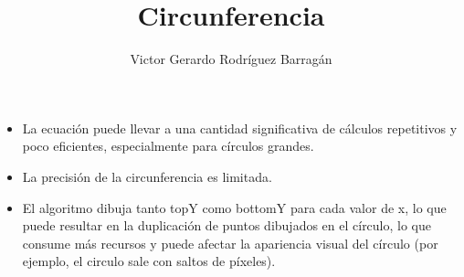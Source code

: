 \documentclass{article}
\title{Circunferencia}
\author{Victor Gerardo Rodríguez Barragán}
\date{}
\begin{document}
\maketitle
\justify

\begin{itemize}
\item La ecuación puede llevar a una cantidad significativa de cálculos repetitivos y poco eficientes,
    especialmente para círculos grandes.
\item La precisión de la circunferencia es limitada.
\item El algoritmo dibuja tanto topY como bottomY para cada valor de x, lo que puede resultar en la
    duplicación de puntos dibujados en el círculo, lo que consume más recursos y puede afectar la
    apariencia visual del círculo (por ejemplo, el circulo sale con saltos de píxeles).
\end{itemize}
\end{document}
